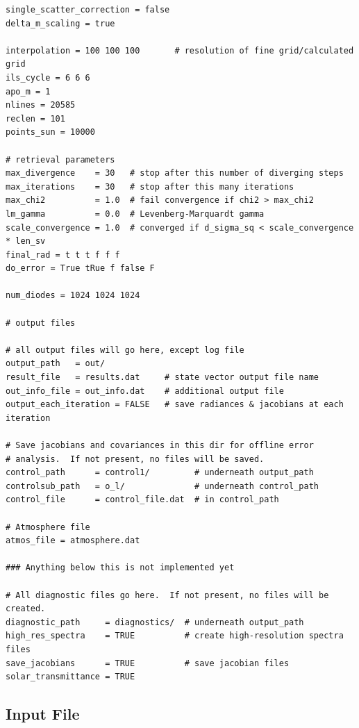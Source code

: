 \documentclass{article}
\begin{document}
\begin{verbatim}
single_scatter_correction = false
delta_m_scaling = true

interpolation = 100 100 100       # resolution of fine grid/calculated grid
ils_cycle = 6 6 6
apo_m = 1
nlines = 20585
reclen = 101
points_sun = 10000

# retrieval parameters
max_divergence    = 30   # stop after this number of diverging steps
max_iterations    = 30   # stop after this many iterations
max_chi2          = 1.0  # fail convergence if chi2 > max_chi2
lm_gamma          = 0.0  # Levenberg-Marquardt gamma 
scale_convergence = 1.0  # converged if d_sigma_sq < scale_convergence * len_sv
final_rad = t t t f f f
do_error = True tRue f false F

num_diodes = 1024 1024 1024

# output files

# all output files will go here, except log file
output_path   = out/
result_file   = results.dat     # state vector output file name
out_info_file = out_info.dat    # additional output file
output_each_iteration = FALSE   # save radiances & jacobians at each iteration

# Save jacobians and covariances in this dir for offline error
# analysis.  If not present, no files will be saved.
control_path      = control1/         # underneath output_path
controlsub_path   = o_l/              # underneath control_path
control_file      = control_file.dat  # in control_path

# Atmosphere file
atmos_file = atmosphere.dat

### Anything below this is not implemented yet

# All diagnostic files go here.  If not present, no files will be created.
diagnostic_path     = diagnostics/  # underneath output_path
high_res_spectra    = TRUE          # create high-resolution spectra files
save_jacobians      = TRUE          # save jacobian files
solar_transmittance = TRUE
\end{verbatim}

\subsection{Input File}
\end{document}
